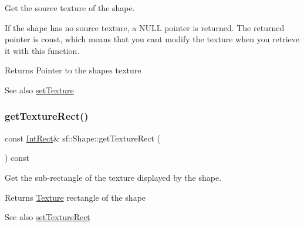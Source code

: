 Get the source texture of the shape. 

If the shape has no source texture, a N\+U\+LL pointer is returned. The returned pointer is const, which means that you can\textquotesingle{}t modify the texture when you retrieve it with this function.

\begin{DoxyReturn}{Returns}
Pointer to the shape\textquotesingle{}s texture
\end{DoxyReturn}
\begin{DoxySeeAlso}{See also}
\mbox{\hyperlink{classsf_1_1_shape_af8fb22bab1956325be5d62282711e3b6}{set\+Texture}} \begin{DoxyVerb}\end{DoxyVerb}
 
\end{DoxySeeAlso}
\mbox{\label{classsf_1_1_shape_ac878aab03c230dc31c44e250d092b9ea}} 
\subsubsection{\texorpdfstring{getTextureRect()}{getTextureRect()}}
{\footnotesize\ttfamily const \mbox{\hyperlink{classsf_1_1_rect}{Int\+Rect}}\& sf\+::\+Shape\+::get\+Texture\+Rect (\begin{DoxyParamCaption}{ }\end{DoxyParamCaption}) const}



Get the sub-\/rectangle of the texture displayed by the shape. 

\begin{DoxyReturn}{Returns}
\mbox{\hyperlink{classsf_1_1_texture}{Texture}} rectangle of the shape
\end{DoxyReturn}
\begin{DoxySeeAlso}{See also}
\mbox{\hyperlink{classsf_1_1_shape_a2029cc820d1740d14ac794b82525e157}{set\+Texture\+Rect}} \begin{DoxyVerb}\end{DoxyVerb}
 
\end{DoxySeeAlso}
\mbox{\label{classsf_1_1_shape_a3506f9b5d916fec14d583d16f23c2485}} 
